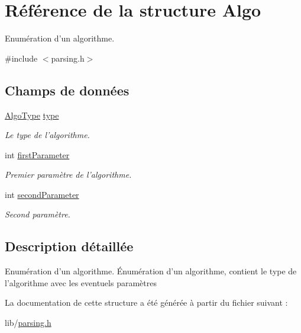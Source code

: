 \hypertarget{structAlgo}{
\section{Référence de la structure Algo}
\label{structAlgo}
}


Enumération d'un algorithme.  




{\ttfamily \#include $<$parsing.h$>$}

\subsection*{Champs de données}
\begin{DoxyCompactItemize}
\item 
\hypertarget{structAlgo_ac238c59b48a6658c527f7ee987e0daac}{
\hyperlink{parsing_8h_aebdeb51354d2ee712846a9e02786cd74}{AlgoType} \hyperlink{structAlgo_ac238c59b48a6658c527f7ee987e0daac}{type}}
\label{structAlgo_ac238c59b48a6658c527f7ee987e0daac}

\begin{DoxyCompactList}\small\item\em Le type de l'algorithme. \item\end{DoxyCompactList}\item 
\hypertarget{structAlgo_a715ddb57a67fbadc6771d167f20d1d2e}{
int \hyperlink{structAlgo_a715ddb57a67fbadc6771d167f20d1d2e}{firstParameter}}
\label{structAlgo_a715ddb57a67fbadc6771d167f20d1d2e}

\begin{DoxyCompactList}\small\item\em Premier paramètre de l'algorithme. \item\end{DoxyCompactList}\item 
\hypertarget{structAlgo_a73bb72b60e1d63c33843ace474b7d957}{
int \hyperlink{structAlgo_a73bb72b60e1d63c33843ace474b7d957}{secondParameter}}
\label{structAlgo_a73bb72b60e1d63c33843ace474b7d957}

\begin{DoxyCompactList}\small\item\em Second paramètre. \item\end{DoxyCompactList}\end{DoxyCompactItemize}


\subsection{Description détaillée}
Enumération d'un algorithme. Énumération d'un algorithme, contient le type de l'algorithme avec les eventuels paramètres 

La documentation de cette structure a été générée à partir du fichier suivant :\begin{DoxyCompactItemize}
\item 
lib/\hyperlink{parsing_8h}{parsing.h}\end{DoxyCompactItemize}

